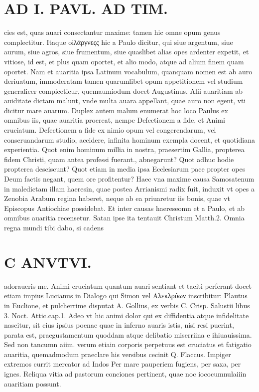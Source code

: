 \documentclass{article}
\begin{document}
\begin{pages}
\section*{AD I. PAVL. AD TIM. }
\marginpar{[ p.40 ]}\pstart cies est, quas auari consectantur maxime: tamen hic omne opum genus complectitur. Itaque oiλάργνεςς hic a Paulo dicitur, qui siue argentum, siue aurum, siue agros, siue frumentum, siue quaslibet alias opes ardenter expetit, et vitiose, id est, et plus quam oportet, et alio modo, atque ad alium finem quam oportet. Nam et auaritia ipsa Latinum vocabulum, quanquam nomen est ab auro deriuatum, immoderatam tamen quarumlibet opum appetitionem vel studium generalicer compicetieur, quemaumiodum docet Augustinus. Alii auaritiam ab auiditate dictam malunt, vnde multa auara appellant, quae auro non egent, vti dicitur mare auarum.  \pend\pstart Duplex autem malum enumerat hoc loco Paulus ex omnibus iis, quae auaritia procreat, nempe Defectionem a fide, et Animi cruciatum. Defectionem a fide ex nimio opum vel congerendarum, vel conseruandarum studio, accidere, infinita hominum exempla docent, et quotidiana experientia. Quot enim hominum millia in nostra, praesertim Gallia, propterea fidem Christi, quam antea professi fuerant., abnegarunt? Quot adhuc hodie propterea desciscunt?  \pend\pstart Quot etiam in media ipsa Ecclesiarum pace propter opes Deum factis negant, quem ore profitentur? Haec vna maxime causa Samosatenum in maledictam illam haeresin, quae postea Arrianismi radix fuit, induxit vt opes a Zenobia Arabum regina haberet, neque ab ea priuaretur iis bonis, quae vt Episcopus Antiochiae possidebat. Et inter causas haereseomn et a Paulo, et ab omnibus auaritia recensetur. Satan ipse ita tentauit Christum Matth.2. Omnia regna mundi tibi dabo, si cadens  \pend
\section*{C ANVTVI. }
\marginpar{[ p.457 ]}\pstart adoraueris me. Animi cruciatum quantum auari sentiant et taciti perferant docet etiam impius Lucianus in Dialogo qui Simon vel Αλεκλρύων inscribitur: Plautus in Euclione, et pulcherrime disputat A. Gollius, ex verbis C. Crisp. Salustii libus 3. Noct. Attic.cap.1. Adeo vt hic animi dolor qui ex diffidentia atque  infidelitate nascitur, sit eius ipsius poenae quae in inferno auaris istis, nisi resi puerint, parata est, praegustamentum quoddam atque  delibatio miserriina e ihiuauissima. Sed non tancumn aiim. verum etiain corporis perpetuus est cruciatus et fatigatio auaritia, quemadmodum praeclare his versibus cecinit Q. Flaccus.  \pend\pstart Impiger extremos currit mercator ad Indos  \pend\pstart Per mare pauperiem fugiens, per saxa, per ignes.  \pend\pstart Reliqua vitia ad pastorum conciones pertinent, quae noc iococumnulaiiin auaritiam possunt.  \pend
{}
{}

\end{pages}
\end{document}
